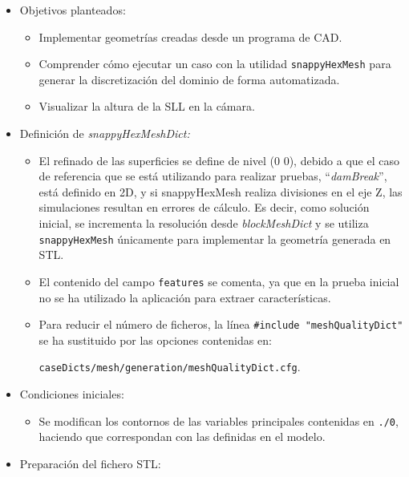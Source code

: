 \begin{itemize}
\item
  Objetivos planteados:

  \begin{itemize}
  \item
    Implementar geometrías creadas desde un programa de CAD.
  \item
    Comprender cómo ejecutar un caso con la utilidad
    \texttt{snappyHexMesh} para generar la discretización del dominio de
    forma automatizada.
  \item
    Visualizar la altura de la SLL en la cámara.
  \end{itemize}
\item
  Definición de \emph{snappyHexMeshDict:}

  \begin{itemize}
  \item
    El refinado de las superficies se define de nivel (0 0), debido a
    que el caso de referencia que se está utilizando para realizar
    pruebas, ``\emph{damBreak}'', está definido en 2D, y si snappyHexMesh
    realiza divisiones en el eje Z, las simulaciones resultan en errores
    de cálculo. Es decir, como solución inicial, se incrementa la
    resolución desde \emph{blockMeshDict} y se utiliza
    \texttt{snappyHexMesh} únicamente para implementar la geometría
    generada en STL.
  \item
    El contenido del campo \texttt{features} se comenta, ya que en la
    prueba inicial no se ha utilizado la aplicación para extraer
    características.
  \item
    Para reducir el número de ficheros, la línea
    \lstinline[style=bash]{#include "meshQualityDict"} se ha sustituido por las
    opciones contenidas en:
    
    \lstinline[style=bash]{caseDicts/mesh/generation/meshQualityDict.cfg}.
  \end{itemize}
\item
  Condiciones iniciales:

  \begin{itemize}
  \item
    Se modifican los contornos de las variables principales contenidas
    en \lstinline[style=bash]{./0}, haciendo que correspondan con las
    definidas en el modelo.
  \end{itemize}
\item
  Preparación del fichero STL:


\end{itemize}
